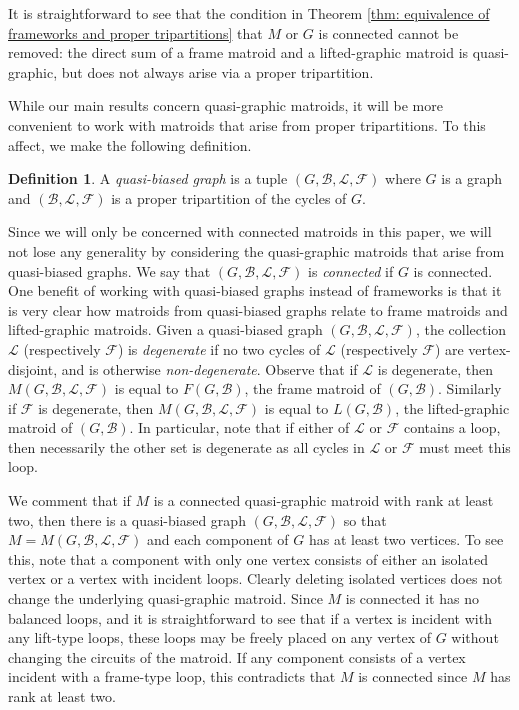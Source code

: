 \documentclass[12pt]{article}
\theoremstyle{definition}
\newtheorem{definition}[theorem]{Definition}
\theoremstyle{plain} %
\newcommand{\cB}{\mathcal{B}}
\newcommand{\cF}{\mathcal{F}}
\newcommand{\cL}{\mathcal{L}}
\begin{document}
It is straightforward to see that the condition in Theorem \ref{thm: equivalence of frameworks and proper tripartitions} that $M$ or $G$ is connected cannot be removed: the direct sum of a frame matroid and a lifted-graphic matroid is quasi-graphic, but does not always arise via a proper tripartition.


While our main results concern quasi-graphic matroids, it will be more convenient to work with matroids that arise from proper tripartitions.
To this affect, we make the following definition.

\begin{definition}
A \emph{quasi-biased graph} is a tuple $(G, \cB, \cL, \cF)$ where $G$ is a graph and $(\cB, \cL, \cF)$ is a proper tripartition of the cycles of $G$.
\end{definition}

Since we will only be concerned with connected matroids in this paper, we will not lose any generality by considering the quasi-graphic matroids that arise from quasi-biased graphs.
We say that $(G, \cB, \cL, \cF)$ is \emph{connected} if $G$ is connected.
One benefit of working with quasi-biased graphs instead of frameworks is that it is very clear how matroids from quasi-biased graphs relate to frame matroids and lifted-graphic matroids.
Given a quasi-biased graph $(G,\cB,\cL,\cF)$, the collection $\cL$ (respectively $\cF$) is \textit{degenerate} if no two cycles of $\cL$ (respectively $\cF$) are vertex-disjoint, and is otherwise \emph{non-degenerate}. Observe that if $\cL$ is degenerate, then $M(G, \cB, \cL, \cF)$ is equal to $F(G, \cB)$, the frame matroid of $(G, \cB)$. 
Similarly if $\cF$ is degenerate, then $M(G, \cB, \cL, \cF)$ is equal to $L(G, \cB)$, the lifted-graphic matroid of $(G, \cB)$.
In particular, note that if either of $\cL$ or $\cF$ contains a loop, then necessarily the other set is degenerate as all cycles in $\cL$ or $\cF$ must meet this loop. 


We comment that if $M$ is a connected quasi-graphic matroid with rank at least two, then there is a quasi-biased graph $(G, \cB, \cL, \cF)$ so that $M = M(G, \cB, \cL, \cF)$ and each component of $G$ has at least two vertices. To see this, note that a component with only one vertex consists of either an isolated vertex or a vertex with incident loops. Clearly deleting isolated vertices does not change the underlying quasi-graphic matroid. Since $M$ is connected it has no balanced loops, and it is straightforward to see that if a vertex is incident with any lift-type loops, these loops may be freely placed on any vertex of $G$ without changing the circuits of the matroid. If any component consists of a vertex incident with a frame-type loop, this contradicts that $M$ is connected since $M$ has rank at least two.
\end{document}
